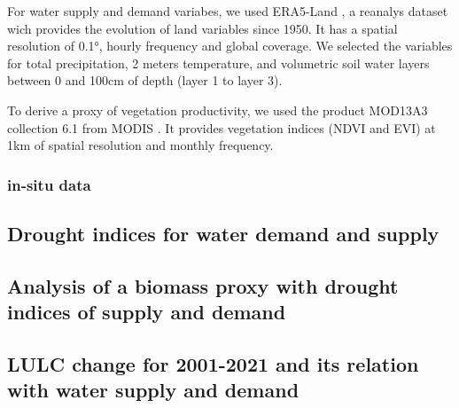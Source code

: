 \documentclass[
  number,
  preprint,
  3p]{elsarticle}
\begin{document}
For water supply and demand variabes, we used ERA5-Land
\citep{Munoz2019}, a reanalys dataset wich provides the evolution of
land variables since 1950. It has a spatial resolution of 0.1°, hourly
frequency and global coverage. We selected the variables for total
precipitation, 2 meters temperature, and volumetric soil water layers
between 0 and 100cm of depth (layer 1 to layer 3).

To derive a proxy of vegetation productivity, we used the product
MOD13A3 collection 6.1 from MODIS \citep{Didan2015}. It provides
vegetation indices (NDVI and EVI) at 1km of spatial resolution and
monthly frequency.

\hypertarget{in-situ-data}{%
\subsubsection{in-situ data}\label{in-situ-data}}

\hypertarget{drought-indices-for-water-demand-and-supply}{%
\subsection{Drought indices for water demand and
supply}\label{drought-indices-for-water-demand-and-supply}}

\hypertarget{analysis-of-a-biomass-proxy-with-drought-indices-of-supply-and-demand}{%
\subsection{Analysis of a biomass proxy with drought indices of supply
and
demand}\label{analysis-of-a-biomass-proxy-with-drought-indices-of-supply-and-demand}}

\hypertarget{lulc-change-for-2001-2021-and-its-relation-with-water-supply-and-demand}{%
\subsection{LULC change for 2001-2021 and its relation with water supply
and
demand}\label{lulc-change-for-2001-2021-and-its-relation-with-water-supply-and-demand}}
\end{document}
